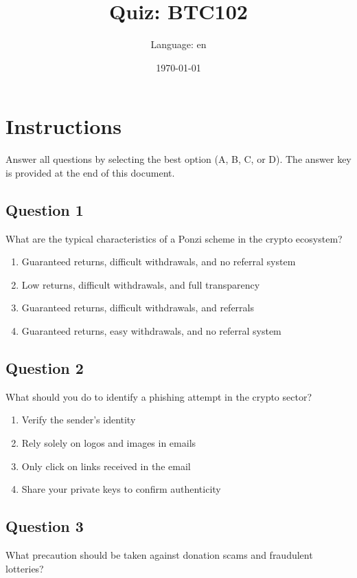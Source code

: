 \documentclass[12pt,a4paper]{article}
\title{Quiz: BTC102}
\author{Language: en}
\date{\today}
\begin{document}
\maketitle
\thispagestyle{fancy}

\section*{Instructions}
Answer all questions by selecting the best option (A, B, C, or D). The answer key is provided at the end of this document.

\bigskip


\subsection*{Question 1}
What are the typical characteristics of a Ponzi scheme in the crypto ecosystem?

\begin{enumerate}[label=\Alph*., leftmargin=*]
\item Guaranteed returns, difficult withdrawals, and no referral system
\item Low returns, difficult withdrawals, and full transparency
\item Guaranteed returns, difficult withdrawals, and referrals
\item Guaranteed returns, easy withdrawals, and no referral system
\end{enumerate}

\bigskip


\subsection*{Question 2}
What should you do to identify a phishing attempt in the crypto sector?

\begin{enumerate}[label=\Alph*., leftmargin=*]
\item Verify the sender's identity
\item Rely solely on logos and images in emails
\item Only click on links received in the email
\item Share your private keys to confirm authenticity
\end{enumerate}

\bigskip


\subsection*{Question 3}
What precaution should be taken against donation scams and fraudulent lotteries?
\end{document}
